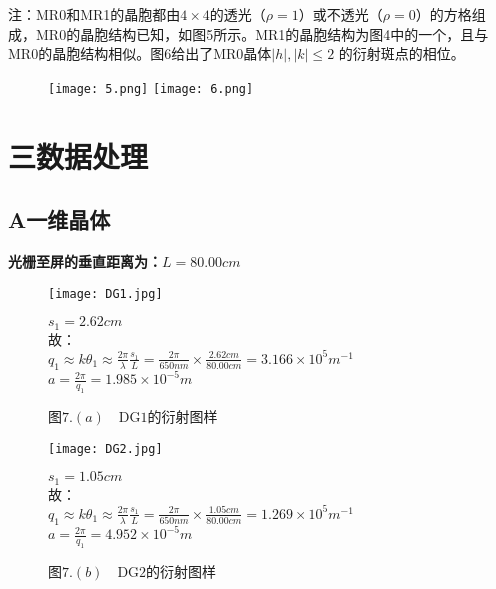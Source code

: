 \documentclass{ctexart}
\begin{document}
注：MR0和MR1的晶胞都由$4\times 4$的透光（$\rho=1$）或不透光（$\rho=0$）的方格组成，MR0的晶胞结构已知，如图5所示。MR1的晶胞结构为图4中的一个，且与MR0的晶胞结构相似。图6给出了MR0晶体$|h|,|k|\leqslant 2$
的衍射斑点的相位。
\begin{figure}[h]                                           
  \texttt{[image: 5.png]}
  \qquad
  \texttt{[image: 6.png]}
\end{figure}

\section*{三\quad 数据处理}
\subsection*{A\quad 一维晶体}
\noindent \textbf{光栅至屏的垂直距离为：$L=80.00cm$}
\begin{figure}[H]
  \begin{minipage}[c]{0.4\linewidth}
    \texttt{[image: DG1.jpg]}
    \caption*{图$7.(a)\quad \mathrm{DG1}$的衍射图样}
    \end{minipage}
    \hspace{1cm}
    \begin{minipage}[c]{0.6\linewidth}
    \noindent $s_1=2.62cm$\\
    故：\\
    $q_1\approx k\theta_1 \approx \frac{2\pi}{\lambda}\frac{s_1}{L}=\frac{2\pi}{650nm} \times \frac{2.62cm}{80.00cm}=3.166\times 10^5m^{-1}$\\
    $a=\frac{2\pi}{q_1}=1.985\times 10^{-5}m$
    \end{minipage}
\end{figure}
\begin{figure}[H]
  \begin{minipage}[c]{0.4\linewidth}
    \texttt{[image: DG2.jpg]}
    \caption*{图$7.(b)\quad \mathrm{DG2}$的衍射图样}
    \end{minipage}
    \hspace{1cm}
    \begin{minipage}[c]{0.6\linewidth}
      \noindent $s_1=1.05cm$\\
      故：\\
      $q_1\approx k\theta_1 \approx \frac{2\pi}{\lambda}\frac{s_1}{L}=\frac{2\pi}{650nm} \times \frac{1.05cm}{80.00cm}=1.269\times 10^5m^{-1}$\\
      $a=\frac{2\pi}{q_1}=4.952\times 10^{-5}m$
    \end{minipage}
\end{figure}
\end{document}
